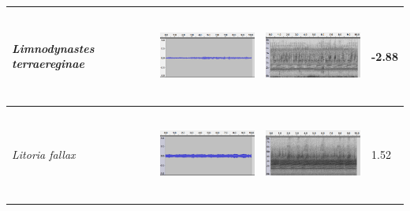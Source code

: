 \begin{table}[htb!]
{\begin{tabular}{llll}
\textit{Limnodynastes terraereginae} &  \begin{minipage}{.3\textwidth} \includegraphics[width=45mm, height=30mm]{image/Ch1/ter_jcu_wav.png}  \end{minipage}        &   \begin{minipage}{.3\textwidth} \includegraphics[width=45mm, height=30mm]{image/Ch1/ter_jcu_spec.png}  \end{minipage}          & -2.88    \\ \hline
\textit{Litoria fallax}              &   \begin{minipage}{.3\textwidth} \includegraphics[width=45mm, height=30mm]{image/Ch1/fallax_jcu_wav.png}  \end{minipage}       &    \begin{minipage}{.3\textwidth} \includegraphics[width=45mm, height=30mm]{image/Ch1/fallax_jcu_spec.png}  \end{minipage}         & 1.52     \\ \hline

\end{tabular}}
\end{table}
